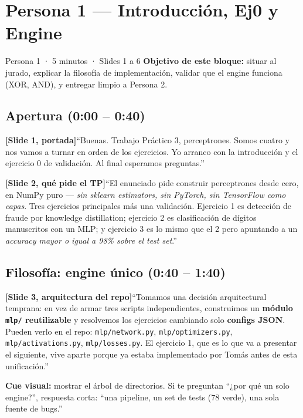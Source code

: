 \documentclass[11pt,a4paper]{article}
\newcommand{\code}[1]{\texttt{\textcolor{accent}{#1}}}
\newcommand{\file}[1]{\texttt{\small #1}}
\newcommand{\slidenum}[1]{\textcolor{accent}{\textbf{[Slide #1]}}}
\newcommand{\timing}[1]{\textcolor{muted}{\small (#1)}}
\newcommand{\enunciado}[1]{\textcolor{warn}{\textit{#1}}}
\begin{document}
\section{Persona 1 — Introducción, Ej0 y Engine}\label{sec:p1}

\begin{persona}{Persona 1 · 5 minutos · Slides 1 a 6}
\textbf{Objetivo de este bloque:} situar al jurado, explicar la filosofía de implementación, validar que el engine funciona (XOR, AND), y entregar limpio a Persona 2.
\end{persona}

\subsection{Apertura \timing{0:00 -- 0:40}}

\slidenum{1, portada}\quad ``Buenas. Trabajo Práctico 3, perceptrones. Somos cuatro y nos vamos a turnar en orden de los ejercicios. Yo arranco con la introducción y el ejercicio 0 de validación. Al final esperamos preguntas.''

\slidenum{2, qué pide el TP}\quad ``El enunciado pide construir perceptrones desde cero, en NumPy puro --- \enunciado{sin sklearn estimators, sin PyTorch, sin TensorFlow como capas}. Tres ejercicios principales más una validación. Ejercicio 1 es detección de fraude por knowledge distillation; ejercicio 2 es clasificación de dígitos manuscritos con un MLP; y ejercicio 3 es lo mismo que el 2 pero apuntando a un \enunciado{accuracy mayor o igual a 98\% sobre el test set}.''

\subsection{Filosofía: engine único \timing{0:40 -- 1:40}}

\slidenum{3, arquitectura del repo}\quad ``Tomamos una decisión arquitectural temprana: en vez de armar tres scripts independientes, construimos un \textbf{módulo \code{mlp/} reutilizable} y resolvemos los ejercicios cambiando solo \textbf{configs JSON}. Pueden verlo en el repo: \file{mlp/network.py}, \file{mlp/optimizers.py}, \file{mlp/activations.py}, \file{mlp/losses.py}. El ejercicio 1, que es lo que va a presentar el siguiente, vive aparte porque ya estaba implementado por Tomás antes de esta unificación.''

\begin{cue}
\textbf{Cue visual:} mostrar el árbol de directorios. Si te preguntan ``¿por qué un solo engine?'', respuesta corta: ``una pipeline, un set de tests (78 verde), una sola fuente de bugs.''
\end{cue}
\end{document}
